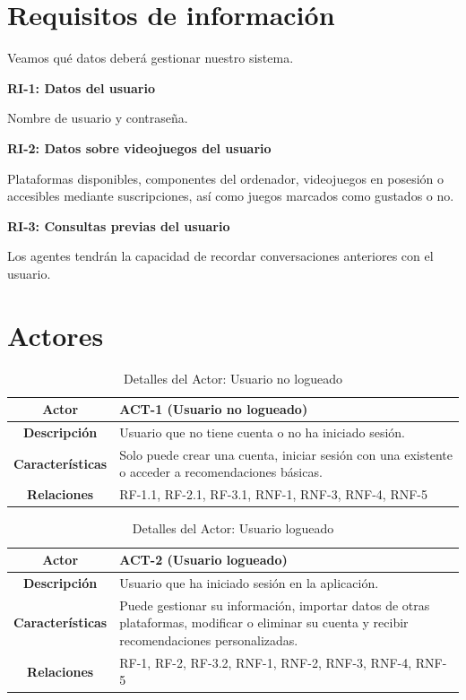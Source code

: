 \newpage
\section{Requisitos de información}

Veamos qué datos deberá gestionar nuestro sistema.

\textbf{RI-1: Datos del usuario}

Nombre de usuario y contraseña.

\textbf{RI-2: Datos sobre videojuegos del usuario}

Plataformas disponibles, componentes del ordenador, videojuegos en posesión o accesibles mediante suscripciones, así como juegos marcados como gustados o no.

\textbf{RI-3: Consultas previas del usuario}

Los agentes tendrán la capacidad de recordar conversaciones anteriores con el usuario.

\newpage

\section{Actores}

\begin{table}[H]
\centering
\begin{tabular}{|c|p{10cm}|}
\hline
\rowcolor{green!40} \textbf{Actor} & ACT-1 (Usuario no logueado)\\ \hline
\rowcolor{blue!10} \textbf{Descripción} & Usuario que no tiene cuenta o no ha iniciado sesión.\\ \hline
\rowcolor{blue!10} \textbf{Características} & Solo puede crear una cuenta, iniciar sesión con una existente o acceder a recomendaciones básicas.\\ \hline
\rowcolor{blue!10} \textbf{Relaciones} & RF-1.1, RF-2.1, RF-3.1, RNF-1, RNF-3, RNF-4, RNF-5\\ \hline
\end{tabular}
\caption{Detalles del Actor: Usuario no logueado}
\end{table}

\vspace{0.5cm}

\begin{table}[H]
\centering
\begin{tabular}{|c|p{10cm}|}
\hline
\rowcolor{green!40} \textbf{Actor} & ACT-2 (Usuario logueado)\\ \hline
\rowcolor{blue!10} \textbf{Descripción} & Usuario que ha iniciado sesión en la aplicación.\\ \hline
\rowcolor{blue!10} \textbf{Características} & Puede gestionar su información, importar datos de otras plataformas, modificar o eliminar su cuenta y recibir recomendaciones personalizadas.\\ \hline
\rowcolor{blue!10} \textbf{Relaciones} & RF-1, RF-2, RF-3.2, RNF-1, RNF-2, RNF-3, RNF-4, RNF-5\\ \hline
\end{tabular}
\caption{Detalles del Actor: Usuario logueado}
\end{table}

